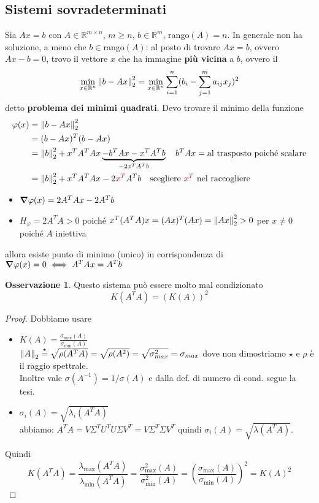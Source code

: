 \documentclass[a4paper,10pt]{article}
\theoremstyle{definition}
\newcommand{\re}{\mathbb{R}} %
\theoremstyle{indentdefinition}
\theoremstyle{indenttheorem}
\theoremstyle{myremark}
\newtheorem*{rem*}{Osservazione}
\theoremstyle{indentgeneral}
\theoremstyle{plain}
\theoremstyle{plain}
\newenvironment{myboxed} 
{\noindent\begin{lrbox}{\mybox}\begin{minipage}{\textwidth}}
{\end{minipage}\end{lrbox}\fbox{\usebox{\mybox}}}
\begin{document}
\subsection{Sistemi sovradeterminati}
Sia $Ax=b$ con $A\in\re^{m\times n}$, $m\ge n$, $b\in\re^m$, rango$(A)=n$. In generale non ha soluzione, a meno che $b\in$rango$(A)$: al posto di trovare $Ax=b$, ovvero $Ax-b=0$, trovo il vettore $x$ che ha immagine \textbf{più vicina} a $b$, ovvero il
$$\min_{x\in\re^n}\norm{b-Ax}_2^2=\min_{x\in\re^n}\sum_{i=1}^n(b_i-\sum_{j=1}^ma_{ij}x_j)^2$$
detto \textbf{problema dei minimi quadrati}. Devo trovare il minimo della funzione
\begin{align*}
    \varphi(x)&=\norm{b-Ax}_2^2\\
    &= (b-Ax)^T(b-Ax) \\
    &= \norm{b}_2^2+x^TA^TAx\underbrace{-b^TAx-x^TA^Tb}_{-2x^TA^Tb} \quad b^TAx =\text{al trasposto poiché scalare}\\
    &= \norm{b}_2^2+x^TA^TAx-2\textcolor{red}{x^T}A^Tb \quad \text{scegliere $\textcolor{red}{x^T}$ nel raccogliere}\\
\end{align*}
\begin{itemize}
    \item $\grad\varphi(x)=2A^TAx-2A^Tb$
    \item $H_\varphi=2A^TA>0$ poiché $x^T(A^TA)x=(Ax)^T(Ax)=\norm{Ax}_2^2>0$ per $x\ne 0$ poiché $A$ iniettiva
\end{itemize}
allora esiste punto di minimo (unico) in corrispondenza di $\grad\varphi(x)=0\iff A^TAx=A^Tb$

\begin{myboxed}
\begin{rem*}
    Questo sistema può essere molto mal condizionato
    $$K(A^TA)=(K(A))^2$$
\end{rem*}
\end{myboxed}
\begin{proof}
   Dobbiamo usare
   \begin{itemize}
       \item $K\left(A\right)=\frac{\sigma_{\max}\left(A\right)}{\sigma_{\min}\left(A\right)} $ \\
       
       \scriptsize{$\norm{A}_2\overset{\star}{=}\sqrt{\rho(A^TA)}=\sqrt{\rho(A^2)}=\sqrt{\sigma_{max}^2}=\sigma_{max}$ dove non dimostriamo $\star$ e $\rho$ è il raggio spettrale. \\
    Inoltre vale $\sigma(A^{-1})=1/\sigma(A)$ e dalla def. di numero di cond. segue la tesi.}
    \normalsize
       \item $\sigma_i(A)=\sqrt{\lambda_i(A^TA)}$\\
       \scriptsize{abbiamo: $A^TA=V\Sigma^TU^TU\Sigma V^T=V\Sigma^T\Sigma V^T$ quindi ${\sigma_i(A)=\sqrt{\lambda(A^TA)}}$.}
       \normalfont
   \end{itemize}
   Quindi $$K(A^TA)=\frac{\lambda_{\max}(A^TA)}{\lambda_{\min}(A^TA)}=\frac{\sigma^2_{\max}(A)}{\sigma^2_{\min}(A)}=\left(\frac{\sigma_{\max}(A)}{\sigma_{\min}(A)}\right)^2=K(A)^2$$
\end{proof}
\end{document}
